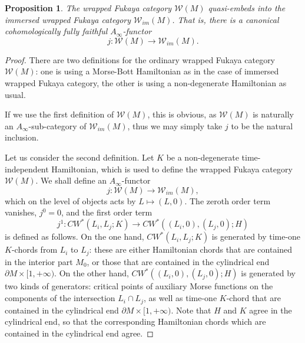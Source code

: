 \documentclass{amsart}
\newtheorem{proposition}[theorem]{Proposition}
\numberwithin{equation}{section}
\numberwithin{figure}{section}
\begin{document}
\begin{proposition}\label{prop: the ordinary wrapped Fukaya category quasi-embeds into the immersed wrapped Fukaya category}
	The wrapped Fukaya category $\mathcal{W}(M)$ quasi-embeds into the immersed wrapped Fukaya category $\mathcal{W}_{im}(M)$. That is, there is a canonical cohomologically fully faithful $A_{\infty}$-functor
\begin{equation}\label{quasi-embedding of the ordinary wrapped Fukaya category into the immersed wrapped Fukaya category}
j: \mathcal{W}(M) \to \mathcal{W}_{im}(M).
\end{equation}
\end{proposition}
\begin{proof}
	There are two definitions for the ordinary wrapped Fukaya category $\mathcal{W}(M)$: one is using a Morse-Bott Hamiltonian as in the case of immersed wrapped Fukaya category, the other is using a non-degenerate Hamiltonian as usual. \par
	If we use the first definition of $\mathcal{W}(M)$, this is obvious, as $\mathcal{W}(M)$ is naturally an $A_{\infty}$-sub-category of $\mathcal{W}_{im}(M)$, thus we may simply take $j$ to be the natural inclusion. \par
	Let us consider the second definition. Let $K$ be a non-degenerate time-independent Hamiltonian, which is used to define the wrapped Fukaya category $\mathcal{W}(M)$. We shall define an $A_{\infty}$-functor
\begin{equation*}
j: \mathcal{W}(M) \to \mathcal{W}_{im}(M),
\end{equation*}
which on the level of objects acts by $L \mapsto (L, 0)$. The zeroth order term vanishes, $j^{0} = 0$, and the first order term
\begin{equation*}
j^{1}: CW^{*}(L_{i}, L_{j}; K) \to CW^{*}((L_{i}, 0), (L_{j}, 0); H)
\end{equation*}
is defined as follows. On the one hand, $CW^{*}(L_{i}, L_{j}; K)$ is generated by time-one $K$-chords from $L_{i}$ to $L_{j}$: these are either Hamiltonian chords that are contained in the interior part $M_{0}$, or those that are contained in the cylindrical end $\partial M \times [1, +\infty)$. On the other hand, $CW^{*}((L_{i}, 0), (L_{j}, 0); H)$ is generated by two kinds of generators: critical points of auxiliary Morse functions on the components of the intersection $L_{i} \cap L_{j}$, as well as time-one $K$-chord that are contained in the cylindrical end $\partial M \times [1, +\infty)$. Note that $H$ and $K$ agree in the cylindrical end, so that the corresponding Hamiltonian chords which are contained in the cylindrical end agree. \par

\end{proof}
\end{document}
